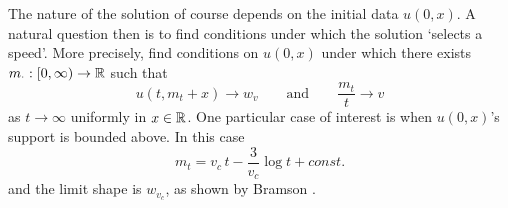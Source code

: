 The nature of the solution of course depends on the initial data $u(0, x)$. A natural question then is to find conditions under which the solution `selects a speed'. More precisely, find conditions on $u(0, x)$ under which there exists $m_\cdot : [0, \infty) \to \mathbb{R}$ such that
\begin{equation}\nonumber
u(t, m_t + x) \to w_v \qquad\text{and}\qquad \frac{m_t}{t} \to v
\end{equation} 
as $t \to \infty$ uniformly in $x \in \mathbb{R}$. One particular case of interest is when $u(0, x)$'s support is bounded above. In this case
\begin{equation}\nonumber
m_t = v_c\,t - \frac{3}{v_c} \log t + const. 
\end{equation}
and the limit shape is $w_{v_c}$, as shown by Bramson \cite{bramson1978maximal}. 

